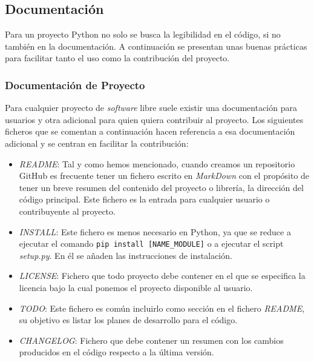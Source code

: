 \subsection*{Documentación}
Para un proyecto Python no solo se busca la legibilidad en el código, si no también en la documentación. A continuación se presentan unas buenas prácticas para facilitar tanto el uso como la contribución del proyecto. 
\subsubsection*{Documentación de  Proyecto}
Para cualquier proyecto de \emph{software} libre suele existir una documentación para usuarios y otra adicional para quien quiera contribuir al proyecto. Los siguientes ficheros que se comentan a continuación hacen referencia a esa documentación adicional y se centran en facilitar la contribución:\\
\begin{itemize}
    \item \textit{README}: Tal y como hemos mencionado, cuando creamos un repositorio GitHub es frecuente tener un fichero escrito en \emph{MarkDown} con el propósito de tener un breve resumen del contenido del proyecto o librería, la dirección del código principal. Este fichero es la entrada para cualquier usuario o contribuyente al proyecto. 
    \item \textit{INSTALL}: Este fichero es menos necesario en Python, ya que se reduce a ejecutar el comando \texttt{pip install [NAME\_MODULE]} o a ejecutar el script \emph{setup.py}. En él se añaden las instrucciones de instalación.
    \item \textit{LICENSE}: Fichero que todo proyecto debe contener en el que se especifica la licencia bajo la cual ponemos el proyecto disponible al usuario.
    \item \textit{TODO}: Este fichero es común incluirlo como sección en el fichero \emph{README}, su objetivo es listar los planes de desarrollo para el código.
    \item \textit{CHANGELOG}: Fichero que debe contener un resumen con los cambios producidos en el código respecto a la última versión.
\end{itemize}

